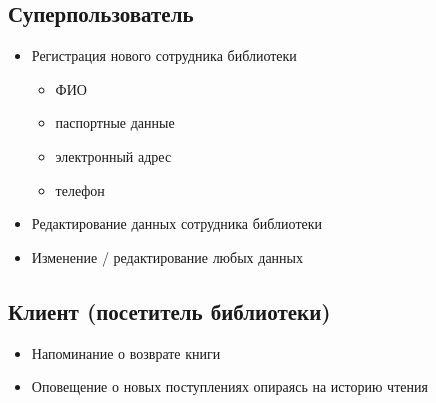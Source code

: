 \documentclass[a4paper,10pt]{article}
\begin{document}
        \newpage


        \subsection{Суперпользователь}

            \begin{itemize}
                \item Регистрация нового сотрудника библиотеки
                    \begin{itemize}
                        \item ФИО
                        \item паспортные данные
                        \item электронный адрес
                        \item телефон
                    \end{itemize}
                \item Редактирование данных сотрудника библиотеки
                \item Изменение / редактирование любых данных
            \end{itemize}


        \subsection{Клиент (посетитель библиотеки)}

            \begin{itemize}
                \item Напоминание о возврате книги
                \item Оповещение о новых поступлениях опираясь на историю чтения
            \end{itemize}
\end{document}
